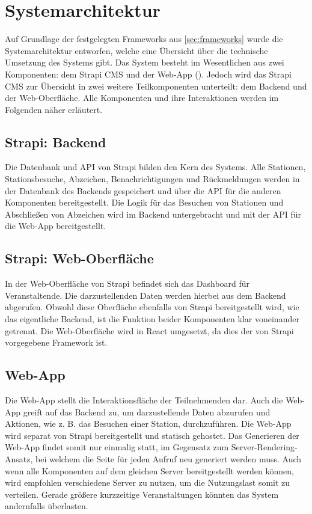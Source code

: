 \section{Systemarchitektur} \label{sec:system-architecture}


Auf Grundlage der festgelegten Frameworks aus \autoref{sec:frameworks} wurde die
Systemarchitektur entworfen, welche eine Übersicht über die technische Umsetzung
des Systems gibt. Das System besteht im Wesentlichen aus zwei Komponenten: dem
Strapi \ac{CMS} und der Web-App (). Jedoch wird das Strapi \ac{CMS} zur Übersicht
in zwei weitere Teilkomponenten unterteilt: dem Backend und der
Web-Oberfläche. Alle Komponenten und ihre Interaktionen werden im Folgenden
näher erläutert.

\subsection{Strapi: Backend}

Die Datenbank und API von Strapi bilden den Kern des Systems. Alle Stationen,
Stationsbesuche, Abzeichen, Benachrichtigungen und Rückmeldungen werden in der
Datenbank des Backends gespeichert und über die API für die anderen Komponenten
bereitgestellt. Die Logik für das Besuchen von Stationen und Abschließen von
Abzeichen wird im Backend untergebracht und mit der API für die Web-App
bereitgestellt.

\subsection{Strapi: Web-Oberfläche}

In der Web-Oberfläche von Strapi befindet sich das Dashboard für Veranstaltende.
Die darzustellenden Daten werden hierbei aus dem Backend abgerufen. Obwohl diese
Oberfläche ebenfalls von Strapi bereitgestellt wird, wie das eigentliche
Backend, ist die Funktion beider Komponenten klar voneinander getrennt. Die
Web-Oberfläche wird in React umgesetzt, da dies der von Strapi vorgegebene
Framework ist.

\subsection{Web-App}

Die Web-App stellt die Interaktionsfläche der Teilnehmenden dar. Auch die
Web-App greift auf das Backend zu, um darzustellende Daten abzurufen und
Aktionen, wie z. B. das Besuchen einer Station, durchzuführen. Die Web-App wird
separat von Strapi bereitgestellt und statisch gehostet. Das Generieren der
Web-App findet somit nur einmalig statt, im Gegensatz zum
Server-Rendering-Ansatz, bei welchem die Seite für jeden Aufruf neu generiert
werden muss. Auch wenn alle Komponenten auf dem gleichen Server bereitgestellt
werden können, wird empfohlen verschiedene Server zu nutzen, um die Nutzungslast
somit zu verteilen. Gerade größere kurzzeitige Veranstaltungen könnten das
System andernfalls überlasten.

